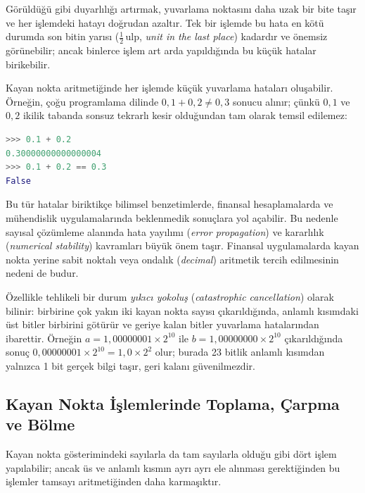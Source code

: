 Görüldüğü gibi duyarlılığı artırmak, yuvarlama noktasını daha uzak bir bite taşır ve her işlemdeki hatayı doğrudan azaltır. Tek bir işlemde bu hata en kötü durumda son bitin yarısı ($\frac{1}{2}\,\text{ulp}$, \emph{unit in the last place}) kadardır ve önemsiz görünebilir; ancak binlerce işlem art arda yapıldığında bu küçük hatalar birikebilir.

\begin{bilginot}
Kayan nokta aritmetiğinde her işlemde küçük yuvarlama hataları oluşabilir. Örneğin, çoğu programlama dilinde $0{,}1 + 0{,}2 \neq 0{,}3$ sonucu alınır; çünkü $0{,}1$ ve $0{,}2$ ikilik tabanda sonsuz tekrarlı kesir olduğundan tam olarak temsil edilemez:

\begin{lstlisting}[language=Python, xleftmargin=2em]
>>> 0.1 + 0.2
0.30000000000000004
>>> 0.1 + 0.2 == 0.3
False
\end{lstlisting}

Bu tür hatalar biriktikçe bilimsel benzetimlerde, finansal hesaplamalarda ve mühendislik uygulamalarında beklenmedik sonuçlara yol açabilir. Bu nedenle sayısal çözümleme alanında hata yayılımı (\emph{error propagation}) ve kararlılık (\emph{numerical stability}) kavramları büyük önem taşır. Finansal uygulamalarda kayan nokta yerine sabit noktalı veya ondalık (\emph{decimal}) aritmetik tercih edilmesinin nedeni de budur.

Özellikle tehlikeli bir durum \emph{yıkıcı yokoluş} (\emph{catastrophic cancellation}) olarak bilinir: birbirine çok yakın iki kayan nokta sayısı çıkarıldığında, anlamlı kısımdaki üst bitler birbirini götürür ve geriye kalan bitler yuvarlama hatalarından ibarettir. Örneğin $a = 1{,}00000001 \times 2^{10}$ ile $b = 1{,}00000000 \times 2^{10}$ çıkarıldığında sonuç $0{,}00000001 \times 2^{10} = 1{,}0 \times 2^{2}$ olur; burada 23 bitlik anlamlı kısımdan yalnızca 1 bit gerçek bilgi taşır, geri kalanı güvenilmezdir.
\end{bilginot}

\subsection{Kayan Nokta İşlemlerinde Toplama, Çarpma ve Bölme}

Kayan nokta gösterimindeki sayılarla da tam sayılarla olduğu gibi dört işlem yapılabilir; ancak üs ve anlamlı kısmın ayrı ayrı ele alınması gerektiğinden bu işlemler tamsayı aritmetiğinden daha karmaşıktır.

